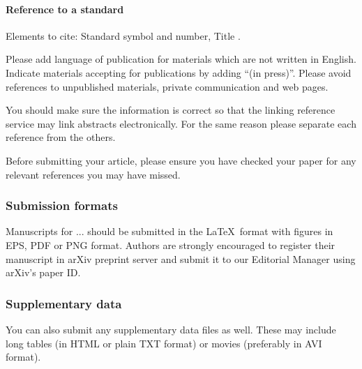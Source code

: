 \documentclass[USenglish,oneside,twocolumn]{article}
\begin{document}
\paragraph{Reference to a standard}
Elements to cite:
Standard symbol and number,
Title \cite{standard-1,standard-2}.

Please add language of publication for materials which are not written in English. Indicate materials accepting for publications by adding ``(in press)''. Please avoid references to unpublished materials, private communication and web pages.

You should make sure the information is correct so that the linking reference service may link abstracts electronically. For the same reason please separate each reference from the others.

Before submitting your article, please ensure you have checked your paper for any relevant references you may have missed.

\subsubsection{Submission formats}

Manuscripts for ... should be submitted in the \LaTeX ~format with figures in EPS, PDF or PNG format. Authors are strongly encouraged to register their manuscript in arXiv preprint server and submit it to our Editorial Manager using arXiv's paper ID.

\subsubsection{Supplementary data}

You can also submit any supplementary data files as well. These may include long tables (in HTML or plain TXT format) or movies (preferably in AVI format).
\end{document}
